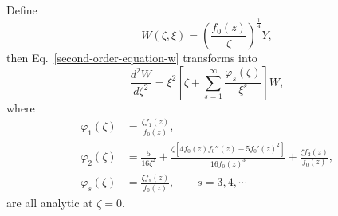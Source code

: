 \documentclass[12pt]{article}
\theoremstyle{plain}
\theoremstyle{definition}
\numberwithin{equation}{section}
\begin{document}
Define
\[
W(\zeta,\xi)=\left(\frac{f_{0}(z)}{\zeta}\right)^{\frac{1}{4}}Y,
\]
then Eq.~\eqref{second-order-equation-w} transforms into
\begin{equation}\label{second-order-equation-W}
\frac{d^{2}W}{d\zeta^2}=\xi^2 \left[\zeta+\sum\limits_{s=1}^{\infty}\frac{\varphi_{s}(\zeta)}{\xi^{s}}\right]W,
\end{equation}
where
\begin{equation}\label{eq-def-varphis}
\begin{split}
\varphi_{1}(\zeta)&=\frac{\zeta f_{1}(z)}{f_{0}(z)},\\
\varphi_{2}(\zeta)&=\frac{5}{16\zeta^2}+\frac{\zeta[4f_{0}(z)f_{0}''(z)-5f_{0}'(z)^2]}{16f_{0}(z)^3}+\frac{\zeta f_{2}(z)}{f_{0}(z)},\\
\varphi_{s}(\zeta)&=\frac{\zeta f_{s}(z)}{f_{0}(z)}, \qquad s=3,4,\cdots
\end{split}
\end{equation}
are all analytic at $\zeta=0$.
\end{document}

